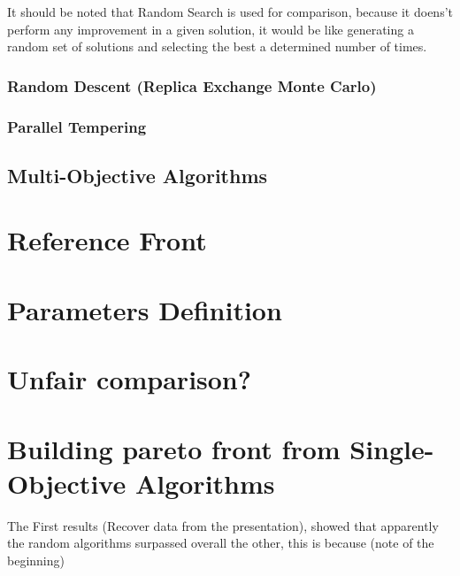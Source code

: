 It should be noted that Random Search is used for comparison, because it doens't perform any improvement in a given solution, it would be like generating a random set of solutions and selecting the best a determined number of times.

\subsubsection{Random Descent (Replica Exchange Monte Carlo)} 
\subsubsection{Parallel Tempering} 

\subsection{Multi-Objective Algorithms}

\section{Reference Front}

\section{Parameters Definition}



\section{Unfair comparison?}

\section{Building pareto front from Single-Objective Algorithms}


The First results (Recover data from the presentation), showed that apparently the random algorithms surpassed overall the other, this is because (note of the beginning) 